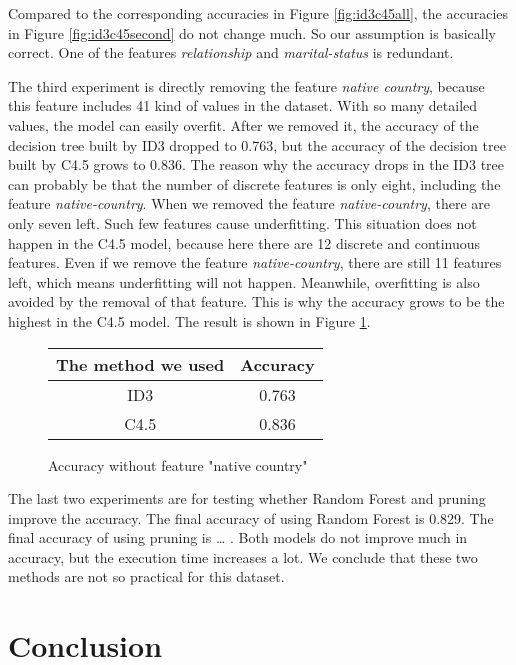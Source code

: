 \documentclass[a4paper]{article}
\begin{document}
Compared to the corresponding accuracies in Figure \ref{fig:id3c45all}, the accuracies in Figure \ref{fig:id3c45second} do not change much. So our assumption is basically correct. One of the features \emph{relationship} and \emph{marital-status} is redundant.

The third experiment is directly removing the feature \emph{native country}, because this feature includes 41 kind of values in the dataset. With so many detailed values, the model can easily overfit. After we removed it, the accuracy of the decision tree built by ID3 dropped to 0.763, but the accuracy of the decision tree built by C4.5 grows to 0.836. The reason why the accuracy drops in the ID3 tree can probably be that the number of discrete features is only eight, including the feature \emph{native-country}. When we removed the feature \emph{native-country}, there are only seven left. Such few features cause underfitting. This situation does not happen in the C4.5 model, because here there are 12 discrete and continuous features. Even if we remove the feature \emph{native-country}, there are still 11 features left, which means underfitting will not happen. Meanwhile, overfitting is also avoided by the removal of that feature. This is why the accuracy grows to be the highest in the C4.5 model. The result is shown in Figure \ref{fig:withoutnc}.
\begin{figure}[h]
	\centering
    \begin{tabular}{c|c}
    The method we used & Accuracy \\
        \hline
        ID3 & 0.763\\
        \hline
        C4.5 & 0.836\\
    \end{tabular}
    \caption{Accuracy without feature "native country"}
    \label{fig:withoutnc}
\end{figure}

The last two experiments are for testing whether Random Forest and pruning improve the accuracy. The final accuracy of using Random Forest is 0.829. The final accuracy of using pruning is \dots {} . Both models do not improve much in accuracy, but the execution time increases a lot. We conclude that these two methods are not so practical for this dataset.

\section{Conclusion}
\end{document}
